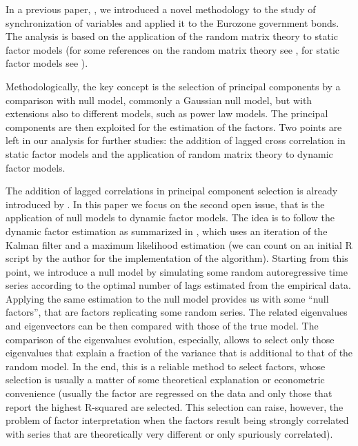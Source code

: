 \documentclass[a4paper,11pt]{article}
\begin{document}
In a previous paper, \cite{barbieri:etal2020}, we introduced a novel methodology to the study of synchronization of variables and applied it to the Eurozone government bonds. The analysis is based on the application of the random matrix theory to static factor models (for some references on the random matrix theory see \citep{bouchaud:potters2009,laloux:etal2000}, for static factor models see \citep{ludvigson:ng2009,bai:ng2008}). 

Methodologically, the key concept is the selection of principal components by a comparison with null model, commonly a Gaussian null model, but with extensions also to different models, such as power law models. The principal components are then exploited for the estimation of the factors. Two points are left in our analysis for further studies: the addition of lagged cross correlation in static factor models and the application of random matrix theory to dynamic factor models. 

The addition of lagged correlations in principal component selection is already introduced by \citep{bouchaud:potters2009}. In this paper we focus on the second open issue, that is the application of null models to dynamic factor models. The idea is to follow the dynamic factor estimation as summarized in \citep{barigozzi2019}, which uses an iteration of the Kalman filter and a maximum likelihood estimation (we can count on an initial R script by the author for the implementation of the algorithm). Starting from this point, we introduce a null model by simulating some random autoregressive time series according to the optimal number of lags estimated from the empirical data. Applying the same estimation to the null model provides us with some ``null factors'', that are factors replicating some random series. The related eigenvalues and eigenvectors can be then compared with those of the true model. The comparison of the eigenvalues evolution, especially, allows to select only those eigenvalues that explain a fraction of the variance that is additional to that of the random model. In the end, this is a reliable method to select factors, whose selection is usually a matter of some theoretical explanation or econometric convenience (usually the factor are regressed on the data and only those that report the highest R-squared are selected. This selection can raise, however, the problem of factor interpretation when the factors result being strongly correlated with series that are theoretically very different or only spuriously correlated).
\end{document}
